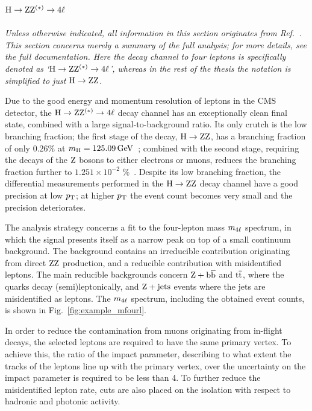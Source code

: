 \subsection{\texorpdfstring{$\mathrm{H}\to\mathrm{Z}\mathrm{Z}^{(\ast)}\to 4\ell$}{H to ZZ to four leptons}}

\emph{%
Unless otherwise indicated, all information in this section originates from Ref.~\cite{Sirunyan:2017exp}. This section concerns merely a summary of the full analysis; for more details, see the full documentation.
% 
Here the decay channel to four leptons is specifically denoted as `$\mathrm{H}\to\mathrm{Z}\mathrm{Z}^{(\ast)}\to 4\ell$', whereas in the rest of the thesis the notation is simplified to just $\mathrm{H}\to\mathrm{Z}\mathrm{Z}$.
}

Due to the good energy and momentum resolution of leptons in the CMS detector, the $\mathrm{H}\to\mathrm{Z}\mathrm{Z}^{(\ast)}\to 4\ell$ decay channel has an exceptionally clean final state, combined with a large signal-to-background ratio.
% 
Its only crutch is the low branching fraction; the first stage of the decay, $\mathrm{H}\to\mathrm{Z}\mathrm{Z}$, has a branching fraction of only $0.26\%$ at $m_{\mathrm{H}} = 125.09\,\text{GeV}$~\cite{deFlorian:2016spz}; combined with the second stage, requiring the decays of the $\mathrm{Z}$ bosons to either electrons or muons, reduces the branching fraction further to $1.251 \times 10^{-2}$ \%~\cite{deFlorian:2016spz}.
% 
Despite its low branching fraction, the differential measurements performed in the $\mathrm{H}\to\mathrm{Z}\mathrm{Z}$ decay channel have a good precision at low $p_\mathrm{T}$; at higher $p_\mathrm{T}$ the event count becomes very small and the precision deteriorates.


The analysis strategy concerns a fit to the four-lepton mass $m_{4\ell}$ spectrum, in which the signal presents itself as a narrow peak on top of a small continuum background.
% 
The background contains an irreducible contribution originating from direct $\mathrm{Z}\mathrm{Z}$ production, and a reducible contribution with misidentified leptons.
% 
The main reducible backgrounds concern $\mathrm{Z} + \mathrm{b}\overline{\mathrm{b}}$ and $\mathrm{t}\overline{\mathrm{t}}$, where the quarks decay (semi)leptonically, and $\mathrm{Z} + \text{jets}$ events where the jets are misidentified as leptons.
% 
The $m_{4\ell}$ spectrum, including the obtained event counts, is shown in Fig.~\ref{fig:example_mfourl}.


In order to reduce the contamination from muons originating from in-flight decays, the selected leptons are required to have the same primary vertex.
% 
To achieve this, the ratio of the impact parameter, describing to what extent the tracks of the leptons line up with the primary vertex, over the uncertainty on the impact parameter is required to be less than 4.
% 
To further reduce the misidentified lepton rate, cuts are also placed on the isolation with respect to hadronic and photonic activity.


